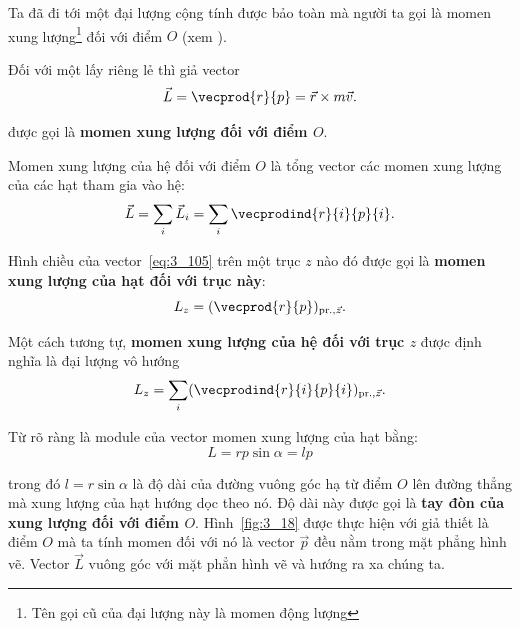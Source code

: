 \noindent
Ta đã đi tới một đại lượng cộng tính được bảo toàn mà người ta gọi là momen xung lượng\footnote{Tên gọi cũ của đại lượng này là momen động lượng} đối với điểm $O$ (xem ).

Đối với một lấy riêng lẻ thì giả vector
\begin{equation}\label{eq:3_105}
\vec{L} = \vecprod{r}{p} = \vec{r}\times m\vec{v}.
\end{equation}

\noindent
được gọi là \textbf{momen xung lượng đối với điểm $O$}.

Momen xung lượng của hệ đối với điểm $O$ là tổng vector các momen xung lượng của các hạt tham gia vào hệ:
\begin{equation}\label{eq:3_106}
\vec{L} = \sum_{i}\vec{L}_i = \sum_{i} \vecprodind{r}{i}{p}{i}.
\end{equation}

Hình chiều của vector~\eqref{eq:3_105} trên một trục $z$ nào đó được gọi là \textbf{momen xung lượng của hạt đối với trục này}:
\begin{equation}\label{eq:3_107}
L_z = (\vecprod{r}{p})_{\text{pr.},\vec{z}}.
\end{equation}

\noindent
Một cách tương tự, \textbf{momen xung lượng của hệ đối với trục $z$} được định nghĩa là đại lượng vô hướng 
\begin{equation}\label{eq:3_108}
L_z = \sum_i (\vecprodind{r}{i}{p}{i})_{\text{pr.},\vec{z}}.
\end{equation}


\noindent
Từ  rõ ràng là module của vector momen xung lượng của hạt bằng:
\begin{equation}\label{eq:3_109}
L = rp\sin\alpha = lp
\end{equation}

\noindent
trong đó $l=r\sin\alpha$ là độ dài của đường vuông góc hạ từ điểm $O$ lên đường thẳng mà xung lượng của hạt hướng dọc theo nó. Độ dài này được gọi là \textbf{tay đòn của xung lượng đối với điểm $O$}. Hình~\ref{fig:3_18} được thực hiện với giả thiết là điểm $O$ mà ta tính momen đối với nó là vector $\vec{p}$ đều nằm trong mặt phẳng hình vẽ. Vector $\vec{L}$ vuông góc với mặt phẳn hình vẽ và hướng ra xa chúng ta.

